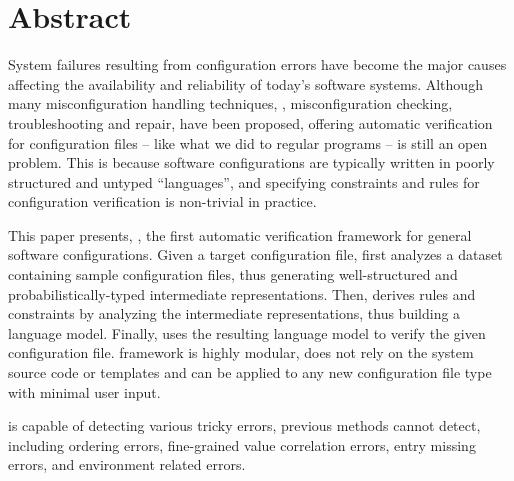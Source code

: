 
\section*{Abstract}

System failures resulting from configuration errors 
have become the major causes affecting the availability and
reliability of today's software systems.
Although many misconfiguration handling techniques,
\eg, misconfiguration checking, troubleshooting and repair, 
have been proposed, 
offering automatic verification for configuration files -- like
what we did to regular programs -- is still an open problem.
This is because software configurations are typically written in
poorly structured and untyped ``languages'', and 
specifying constraints and rules for configuration 
verification is non-trivial in practice.

This paper presents, \app, the first automatic verification framework for
general software configurations.
Given a target configuration file,
\app first analyzes a dataset containing sample configuration files,
thus generating well-structured and probabilistically-typed 
intermediate representations.
Then, \app derives rules and constraints by analyzing
the intermediate representations, thus building a language model.
Finally, \app uses the resulting language model
to verify the given configuration file.
\app framework is highly modular, 
does not rely on the system source code or templates and
can be applied to any new configuration file type with minimal user input. 

\app is capable of detecting various tricky errors,
previous methods cannot detect,
including ordering errors, fine-grained value correlation errors, 
entry missing errors, and environment related errors. 
